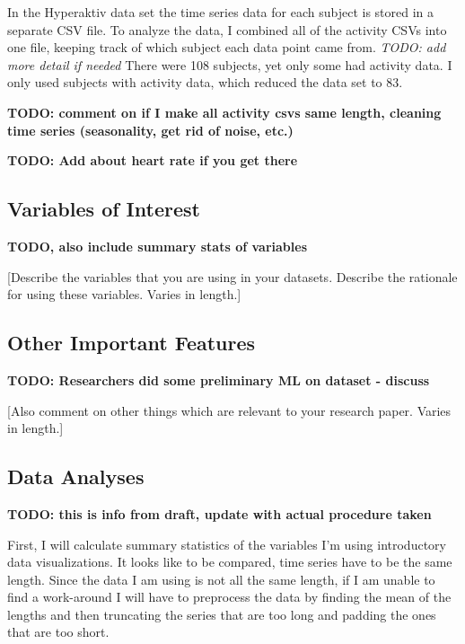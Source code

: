 \documentclass[,article,submit,moreauthors,pdftex]{mdpi}
\begin{document}
In the Hyperaktiv data set the time series data for each subject is
stored in a separate CSV file. To analyze the data, I combined all of
the activity CSVs into one file, keeping track of which subject each
data point came from. \emph{TODO: add more detail if needed} There were
108 subjects, yet only some had activity data. I only used subjects with
activity data, which reduced the data set to 83.

\textbf{TODO: comment on if I make all activity csvs same length,
cleaning time series (seasonality, get rid of noise, etc.)}

\textbf{TODO: Add about heart rate if you get there}

\hypertarget{variables-of-interest}{%
\subsection{Variables of Interest}\label{variables-of-interest}}

\textbf{TODO, also include summary stats of variables}

{[}Describe the variables that you are using in your datasets. Describe
the rationale for using these variables. Varies in length.{]}

\hypertarget{other-important-features}{%
\subsection{Other Important Features}\label{other-important-features}}

\textbf{TODO: Researchers did some preliminary ML on dataset - discuss}

{[}Also comment on other things which are relevant to your research
paper. Varies in length.{]}

\hypertarget{data-analyses}{%
\subsection{Data Analyses}\label{data-analyses}}

\textbf{TODO: this is info from draft, update with actual procedure
taken}

First, I will calculate summary statistics of the variables I'm using
introductory data visualizations. It looks like to be compared, time
series have to be the same length. Since the data I am using is not all
the same length, if I am unable to find a work-around I will have to
preprocess the data by finding the mean of the lengths and then
truncating the series that are too long and padding the ones that are
too short.
\end{document}
